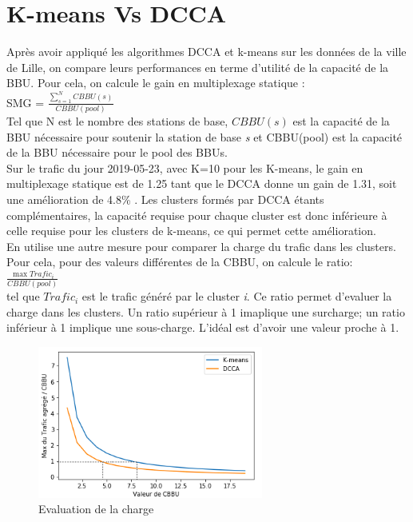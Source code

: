 \documentclass{report}
\begin{document}
\section{K-means Vs DCCA}
Après avoir appliqué les algorithmes DCCA et k-means sur les données de la ville de Lille, on compare leurs performances en terme d'utilité de la capacité de la BBU. 
Pour cela, on calcule le gain en multiplexage statique :\\
SMG = $\frac{\sum_{s=1}^N CBBU(s)} {CBBU(pool)}$  \\
Tel que N est le nombre des stations de base, $CBBU(s)$ est la capacité de la BBU nécessaire pour soutenir la station 
de base \emph{s} et CBBU(pool) est la capacité de la BBU nécessaire pour le pool des BBUs.\\
Sur le trafic du jour 2019-05-23, avec K=10 pour les K-means, le gain en multiplexage statique est de 1.25 tant que le DCCA 
donne un gain de 1.31, soit une amélioration de 4.8\% . Les clusters formés par DCCA étants complémentaires, la capacité requise 
pour chaque cluster est donc inférieure à celle requise pour les clusters de k-means, ce qui permet cette amélioration.\\
En utilise une autre mesure pour comparer la charge du trafic dans les clusters. Pour cela, pour des valeurs différentes 
de la CBBU, on calcule le ratio:\\
 $\frac{\max{Trafic_{i}}} {CBBU(pool)}$ 
 \\tel que $Trafic_{i}$ est le trafic généré par le cluster \emph{i}. 
Ce ratio permet d'evaluer la charge dans les clusters. Un ratio supérieur à 1 imaplique une surcharge; un ratio inférieur à 1 implique une sous-charge.
L'idéal est d'avoir une valeur proche à 1.\\
 \begin{figure}[h]
  \centering
  \includegraphics[width=20em]{images/kmeans_vs_dcca.png}
  \caption{Evaluation de la charge}
\end{figure}\\
\end{document}
